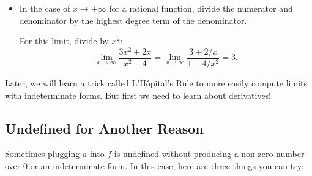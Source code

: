 \begin{itemize}
\begin{exampleblock}
To use the sine limit, make the denominator match the angle:
$$\lim_{x\to0}\frac{\sin(5x)}{2x}
=\frac52\lim_{x\to0}\frac{\sin(5x)}{5x}=\frac52.$$
Here $5x\to0$ as $x\to0$.
\end{exampleblock}

\item In the case of $x\to\pm\infty$ for a rational function, divide the numerator and denominator by the highest degree term of the denominator.
\begin{exampleblock}
For this limit, divide by $x^2$:
$$\lim_{x\to\infty}\frac{3x^2+2x}{x^2-4}
=\lim_{x\to\infty}\frac{3+2/x}{1-4/x^2}=3.$$
\end{exampleblock}
\end{itemize}

Later, we will learn a trick called L'H\^opital's Rule to more easily compute limits with indeterminate forms. But first we need to learn about derivatives!


\subsection{Undefined for Another Reason}

Sometimes plugging $a$ into $f$ is undefined without producing a non-zero number over 0 or an indeterminate form. In this case, here are three things you can try:

